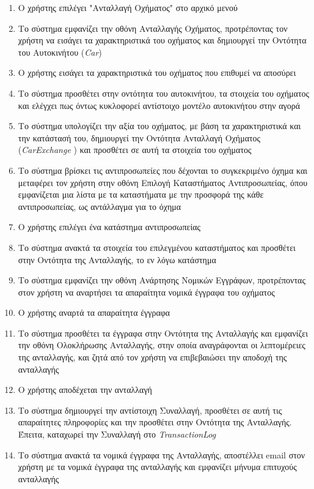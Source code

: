 \documentclass{../ol-softwaremanual}
\begin{document}
	\begin{enumerate}
		\item Ο χρήστης επιλέγει \en"\gr Ανταλλαγή Οχήματος\en" \gr στο αρχικό μενού		
		\item Το σύστημα εμφανίζει την οθόνη Ανταλλαγής Οχήματος, προτρέποντας τον χρήστη να εισάγει τα χαρακτηριστικά του οχήματος και δημιουργεί την Οντότητα του Αυτοκινήτου (\en \textit{Car}\gr)		
		\item Ο χρήστης εισάγει τα χαρακτηριστικά του οχήματος που επιθυμεί να αποσύρει
		\item Το σύστημα προσθέτει στην οντότητα του αυτοκινήτου, τα στοιχεία του οχήματος και ελέγχει πως όντως κυκλοφορεί αντίστοιχο μοντέλο αυτοκινήτου στην αγορά 
		\item Το σύστημα υπολογίζει την αξία του οχήματος, με βάση τα χαρακτηριστικά και την κατάστασή του, δημιουργεί την Οντότητα Ανταλλαγή Οχήματος (\en \textit{CarExchange} \gr) και προσθέτει σε αυτή τα στοιχεία του οχήματος
		\item Το σύστημα βρίσκει τις αντιπροσωπείες που δέχονται το συγκεκριμένο όχημα και μεταφέρει τον χρήστη στην οθόνη Επιλογή Καταστήματος Αντιπροσωπείας, όπου εμφανίζεται μια λίστα με τα καταστήματα με την προσφορά της κάθε αντιπροσωπείας, ως αντάλλαγμα για το όχημα
		\item Ο χρήστης επιλέγει ένα κατάστημα αντιπροσωπείας
		\item Το σύστημα ανακτά τα στοιχεία του επιλεγμένου καταστήματος και προσθέτει στην Οντότητα της Ανταλλαγής, το εν λόγω κατάστημα
		\item Το σύστημα εμφανίζει την οθόνη Ανάρτησης Νομικών Εγγράφων, προτρέποντας στον χρήστη να αναρτήσει τα απαραίτητα νομικά έγγραφα του οχήματος
		\item Ο χρήστης αναρτά τα απαραίτητα έγγραφα		
		\item Το σύστημα προσθέτει τα έγγραφα στην Οντότητα της Ανταλλαγής και εμφανίζει την οθόνη Ολοκλήρωσης Ανταλλαγής, στην οποία αναγράφονται οι λεπτομέρειες της ανταλλαγής, και ζητά από τον χρήστη να επιβεβαιώσει την αποδοχή της ανταλλαγής
		\item Ο χρήστης αποδέχεται την ανταλλαγή
		\item Το σύστημα δημιουργεί την αντίστοιχη Συναλλαγή, προσθέτει σε αυτή τις απαραίτητες πληροφορίες και την προσθέτει στην Οντότητα της Ανταλλαγής. Έπειτα, καταχωρεί την Συναλλαγή στο \en\textit{TransactionLog} \gr
		\item Το σύστημα ανακτά τα νομικά έγγραφα της Ανταλλαγής, αποστέλλει \en email \gr στον χρήστη με τα νομικά έγγραφα της ανταλλαγής και εμφανίζει μήνυμα επιτυχούς ανταλλαγής
	\end{enumerate}
	
\end{document}
